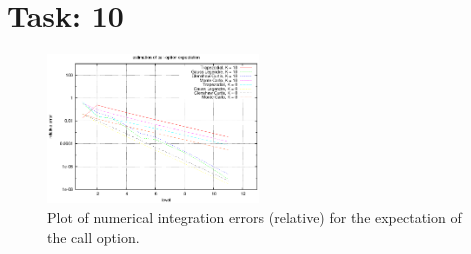 \documentclass{article}
\begin{document}
\section*{Task: 10}

\begin{figure}[htbp]
  \centering
    \includegraphics[width=0.50\textwidth]{../Task10/task10_convergence_plot.eps}
  \caption{Plot of numerical integration errors (relative) for the expectation of the call option.}
\end{figure}
\end{document}
